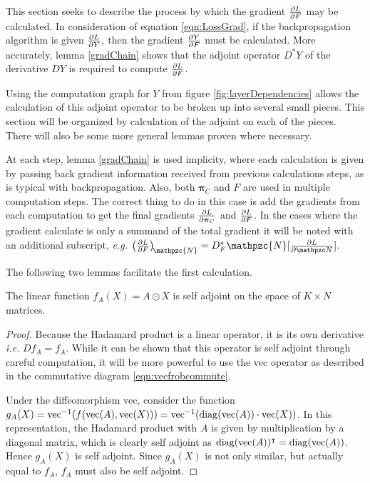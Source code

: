 \label{subsect:dLdYcalc}
This section seeks to describe the process by which the gradient \( \pdv{L}{F} \) may be calculated.  In consideration of equation \eqref{eqn:LossGrad}, if the backpropagation algorithm is given \(\pdv{L}{Y},\) then the gradient \( \pdv{Y}{F} \) must be calculated.  More accurately, lemma \ref{gradChain} shows that the adjoint operator \( D^{\ast}Y \) of the derivative \( DY \) is required to compute \( \pdv{L}{F} \).  

Using the computation graph for $Y$ from figure \ref{fig:layerDependencies} allows the calculation of this adjoint operator to be broken up into several small pieces. This section will be organized by calculation of the adjoint on each of the pieces.  There will also be some more general lemmas proven where necessary.

At each step, lemma \ref{gradChain} is used implicity, where each calculation is given by passing back gradient information received from previous calculations steps, as is typical with backpropagation. Also, both \( \bm\pi_C \) and \( F \) are used in multiple computation steps.  The correct thing to do in this case is add the gradients from each computation to get the final gradients \( \pdv{L}{\bm\pi_C} \) and \( \pdv{L}{F} \). In the cases where the gradient calculate is only a summand of the total gradient it will be noted with an additional subscript, \textit{e.g.} \( \left(\pdv{L}{F}\right)_{\!\mathpzc{N}} =  D_F^{\ast}\mathpzc{N}[\pdv{L}{\mathpzc N}]\).


The following two lemmas facilitate the first calculation.
\begin{lemm}\label{lemm:hadProdAdj}
	The linear function $f_A(X)=A\odot X$ is self adjoint on the space of \( K\times N \) matrices.
\end{lemm}
\begin{proof}
	Because the Hadamard product is a linear operator, it is its own derivative \textit{i.e.} \( Df_A=f_A \). While it can be shown that this operator is self adjoint through careful computation, it will be more powerful to use the vec operator as described in the commutative diagram \eqref{eqn:vecfrobcommute}.
	
	Under the diffeomorphism vec, consider the function \( g_A(X) = \operatorname{vec}^{-1}(f(\operatorname{vec}(A),\operatorname{vec}(X))) =\operatorname{vec}^{-1}(\operatorname*{diag}(\operatorname{vec}(A)) \cdot\operatorname{vec}(X)) \). In this representation, the Hadamard product with \( A \) is given by multiplication by a diagonal matrix, which is clearly self adjoint as \( \operatorname*{diag}(\operatorname{vec}(A))^{\intercal} = \operatorname*{diag}(\operatorname{vec}(A))\).  Hence \( g_A(X) \) is self adjoint.  Since \( g_A(X) \) is not only similar, but actually equal to \( f_A \), \(f_A \) must also be self adjoint.
\end{proof}

